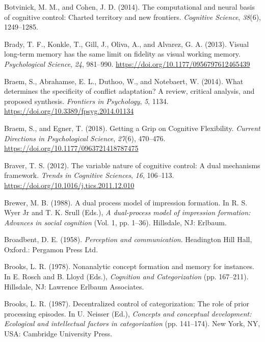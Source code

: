 \documentclass[]{DissertateCUNY}
\begin{document}
\leavevmode\hypertarget{ref-botvinick_computational_2014}{}%
Botvinick, M. M., and Cohen, J. D. (2014). The computational and neural
basis of cognitive control: Charted territory and new frontiers.
\emph{Cognitive Science}, \emph{38}(6), 1249--1285.

\leavevmode\hypertarget{ref-brady_visual_2013}{}%
Brady, T. F., Konkle, T., Gill, J., Oliva, A., and Alvarez, G. A.
(2013). Visual long-term memory has the same limit on fidelity as visual
working memory. \emph{Psychological Science}, \emph{24}, 981--990.
\url{https://doi.org/10.1177/0956797612465439}

\leavevmode\hypertarget{ref-braem_what_2014}{}%
Braem, S., Abrahamse, E. L., Duthoo, W., and Notebaert, W. (2014). What
determines the specificity of conflict adaptation? A review, critical
analysis, and proposed synthesis. \emph{Frontiers in Psychology},
\emph{5}, 1134. \url{https://doi.org/10.3389/fpsyg.2014.01134}

\leavevmode\hypertarget{ref-braem_getting_2018}{}%
Braem, S., and Egner, T. (2018). Getting a Grip on Cognitive
Flexibility. \emph{Current Directions in Psychological Science},
\emph{27}(6), 470--476. \url{https://doi.org/10.1177/0963721418787475}

\leavevmode\hypertarget{ref-braver_variable_2012}{}%
Braver, T. S. (2012). The variable nature of cognitive control: A dual
mechanisms framework. \emph{Trends in Cognitive Sciences}, \emph{16},
106--113. \url{https://doi.org/10.1016/j.tics.2011.12.010}

\leavevmode\hypertarget{ref-brewer_dual_1988}{}%
Brewer, M. B. (1988). A dual process model of impression formation. In
R. S. Wyer Jr and T. K. Srull (Eds.), \emph{A dual-process model of
impression formation: Advances in social cognition} (Vol. 1, pp. 1--36).
Hillsdale, NJ: Erlbaum.

\leavevmode\hypertarget{ref-broadbent_perception_1958}{}%
Broadbent, D. E. (1958). \emph{Perception and communication}. Headington
Hill Hall, Oxford.: Pergamon Press Ltd.

\leavevmode\hypertarget{ref-brooks_nonanalytic_1978}{}%
Brooks, L. R. (1978). Nonanalytic concept formation and memory for
instances. In E. Rosch and B. Lloyd (Eds.), \emph{Cognition and
Categorization} (pp. 167--211). Hillsdale, NJ: Lawrence Erlbaum
Associates.

\leavevmode\hypertarget{ref-brooks_decentralized_1987}{}%
Brooks, L. R. (1987). Decentralized control of categorization: The role
of prior processing episodes. In U. Neisser (Ed.), \emph{Concepts and
conceptual development: Ecological and intellectual factors in
categorization} (pp. 141--174). New York, NY, USA: Cambridge University
Press.
\end{document}
